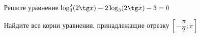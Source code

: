\begin{ex}
	\begin{condition}
		\begin{enumcols}[label=\asbuk*)]
			\item Решите уравнение \( \log_3^2 (2\tg x )-2\log_3 (2\tg x) - 3 = 0 \)
			\item Найдите все корни уравнения, принадлежащие отрезку \( \left[-\dfrac{\pi}{2};\pi\right] \)
		\end{enumcols}
	\end{condition}
\end{ex}